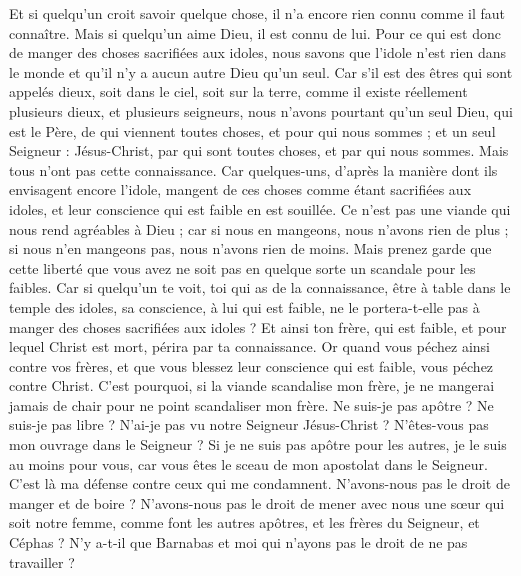 \begin{multicols}{2}
Et si quelqu'un croit savoir quelque chose, il n'a encore rien connu comme il faut connaître.
Mais si quelqu'un aime Dieu, il est connu de lui.
Pour ce qui est donc de manger des choses sacrifiées aux idoles, nous savons que l'idole n'est rien dans le monde et qu'il n'y a aucun autre Dieu qu’un seul.
Car s’il est des êtres qui sont appelés dieux, soit dans le ciel, soit sur la terre, comme il existe réellement plusieurs dieux, et plusieurs seigneurs,
nous n’avons pourtant qu'un seul Dieu, qui est le Père, de qui viennent toutes choses, et pour qui nous sommes ; et un seul Seigneur : Jésus-Christ, par qui sont toutes choses, et par qui nous sommes.
Mais tous n’ont pas cette connaissance. Car quelques-uns, d’après la manière dont ils envisagent encore l'idole, mangent de ces choses comme étant sacrifiées aux idoles, et leur conscience qui est faible en est souillée.
Ce n’est pas une viande qui nous rend agréables à Dieu ; car si nous en mangeons, nous n'avons rien de plus ; si nous n’en mangeons pas, nous n’avons rien de moins.
Mais prenez garde que cette liberté que vous avez ne soit pas en quelque sorte un scandale pour les faibles.
Car si quelqu'un te voit, toi qui as de la connaissance, être à table dans le temple des idoles, sa conscience, à lui qui est faible, ne le portera-t-elle pas à manger des choses sacrifiées aux idoles ?
Et ainsi ton frère, qui est faible, et pour lequel Christ est mort, périra par ta connaissance.
Or quand vous péchez ainsi contre vos frères, et que vous blessez leur conscience qui est faible, vous péchez contre Christ.
C'est pourquoi, si la viande scandalise mon frère, je ne mangerai jamais de chair pour ne point scandaliser mon frère.
\VerseOne{}Ne suis-je pas apôtre ? Ne suis-je pas libre ? N’ai-je pas vu notre Seigneur Jésus-Christ ? N’êtes-vous pas mon ouvrage dans le Seigneur ?
Si je ne suis pas apôtre pour les autres, je le suis au moins pour vous, car vous êtes le sceau de mon apostolat dans le Seigneur.
C'est là ma défense contre ceux qui me condamnent.
N'avons-nous pas le droit de manger et de boire ?
N'avons-nous pas le droit de mener avec nous une sœur qui soit notre femme, comme font les autres apôtres, et les frères du Seigneur, et Céphas ?
N'y a-t-il que Barnabas et moi qui n'ayons pas le droit de ne pas travailler ?

\end{multicols}
